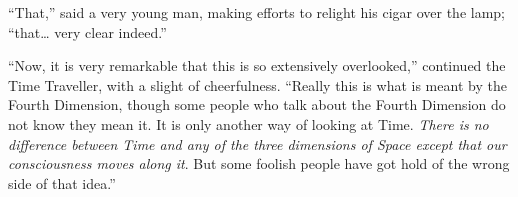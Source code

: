 \documentclass{fiche}
\begin{document}
\begin{texte}
``That,'' said a very young man, making  efforts to relight
his cigar over the lamp; ``that\ldots{} very clear indeed.''

``Now, it is very remarkable that this is so extensively overlooked,'' continued the Time
Traveller, with a slight  of cheerfulness. ``Really
this is what is meant by the Fourth Dimension, though some people who talk about the Fourth
Dimension do not know they mean it. It is only another way of looking at Time.
\emph{There is no difference between Time and any of the three dimensions of Space except
that our consciousness moves along it}. But some foolish people have got hold of the wrong
side of that idea.''
\end{texte}

\end{document}
